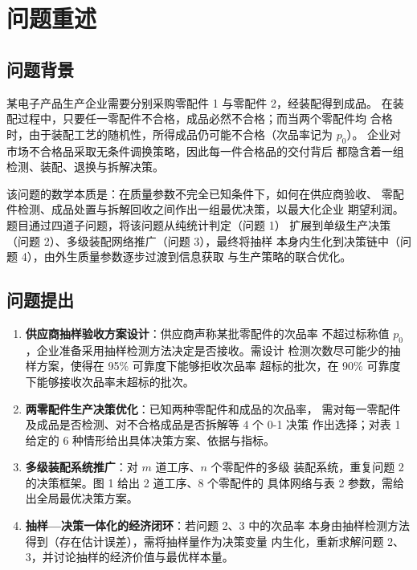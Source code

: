 \documentclass[withoutpreface,bwprint]{cumcmthesis}
\begin{document}
\tableofcontents
\newpage

\section{问题重述}

\subsection{问题背景}

某电子产品生产企业需要分别采购零配件 1 与零配件 2，经装配得到成品。
在装配过程中，只要任一零配件不合格，成品必然不合格；而当两个零配件均
合格时，由于装配工艺的随机性，所得成品仍可能不合格（次品率记为 $p_0$）。
企业对市场不合格品采取无条件调换策略，因此每一件合格品的交付背后
都隐含着一组检测、装配、退换与拆解决策。

该问题的数学本质是：在质量参数不完全已知条件下，如何在供应商验收、
零配件检测、成品处置与拆解回收之间作出一组最优决策，以最大化企业
期望利润。题目通过四道子问题，将该问题从纯统计判定（问题 1）
扩展到单级生产决策（问题 2）、多级装配网络推广（问题 3），最终将抽样
本身内生化到决策链中（问题 4），由外生质量参数逐步过渡到信息获取
与生产策略的联合优化。

\subsection{问题提出}

\begin{enumerate}
    \item \textbf{供应商抽样验收方案设计}：供应商声称某批零配件的次品率
    不超过标称值 $p_0$，企业准备采用抽样检测方法决定是否接收。需设计
    检测次数尽可能少的抽样方案，使得在 95\% 可靠度下能够拒收次品率
    超标的批次，在 90\% 可靠度下能够接收次品率未超标的批次。

    \item \textbf{两零配件生产决策优化}：已知两种零配件和成品的次品率，
    需对每一零配件及成品是否检测、对不合格成品是否拆解等 4 个 0-1 决策
    作出选择；对表 1 给定的 6 种情形给出具体决策方案、依据与指标。

    \item \textbf{多级装配系统推广}：对 $m$ 道工序、$n$ 个零配件的多级
    装配系统，重复问题 2 的决策框架。图 1 给出 2 道工序、8 个零配件的
    具体网络与表 2 参数，需给出全局最优决策方案。

    \item \textbf{抽样—决策一体化的经济闭环}：若问题 2、3 中的次品率
    本身由抽样检测方法得到（存在估计误差），需将抽样量作为决策变量
    内生化，重新求解问题 2、3，并讨论抽样的经济价值与最优样本量。
\end{enumerate}
\end{document}
